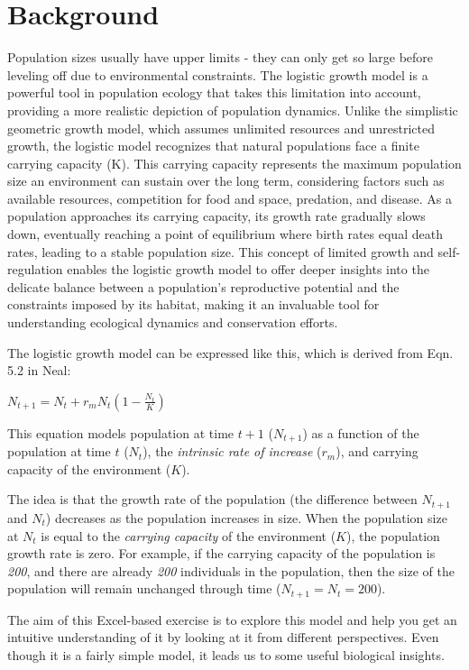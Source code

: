 \documentclass[
  a4paper]{book}
\begin{document}
\hypertarget{background-3}{%
\section{Background}\label{background-3}}

Population sizes usually have upper limits - they can only get so large before leveling off due to environmental constraints. The logistic growth model is a powerful tool in population ecology that takes this limitation into account, providing a more realistic depiction of population dynamics. Unlike the simplistic geometric growth model, which assumes unlimited resources and unrestricted growth, the logistic model recognizes that natural populations face a finite carrying capacity (K). This carrying capacity represents the maximum population size an environment can sustain over the long term, considering factors such as available resources, competition for food and space, predation, and disease. As a population approaches its carrying capacity, its growth rate gradually slows down, eventually reaching a point of equilibrium where birth rates equal death rates, leading to a stable population size. This concept of limited growth and self-regulation enables the logistic growth model to offer deeper insights into the delicate balance between a population's reproductive potential and the constraints imposed by its habitat, making it an invaluable tool for understanding ecological dynamics and conservation efforts.

The logistic growth model can be expressed like this, which is derived from Eqn. 5.2 in Neal:

\(N_{t+1}=N_{t}+r_{m} N_{t}\left(1-\frac{N_{t}}{K}\right)\)

This equation models population at time \(t+1\) (\(N_{t+1}\)) as a function of the population at time \(t\) (\(N_t\)), the \emph{intrinsic rate of increase} (\(r_m\)), and carrying capacity of the environment (\(K\)).

The idea is that the growth rate of the population (the difference between \(N_{t+1}\) and \(N_t\)) decreases as the population increases in size. When the population size at \(N_t\) is equal to the \emph{carrying capacity} of the environment (\(K\)), the population growth rate is zero. For example, if the carrying capacity of the population is \emph{200}, and there are already \emph{200} individuals in the population, then the size of the population will remain unchanged through time (\(N_{t+1} = N_t = 200\)).

The aim of this Excel-based exercise is to explore this model and help you get an intuitive understanding of it by looking at it from different perspectives. Even though it is a fairly simple model, it leads us to some useful biological insights.
\end{document}
